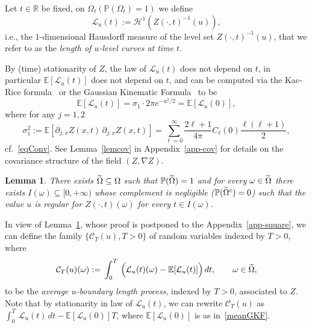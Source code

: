 \documentclass[10pt]{amsart}
\newtheorem{lemm}[theo]{Lemma}\newtheorem{prop}[theo]{Proposition}\newtheorem{coro}[theo]{Corollary}\newtheorem{conj}[theo]{Conjecture}
\theoremstyle{definition}\newtheorem{defi}[theo]{Definition}\newtheorem{rema}[theo]{Remark}\newtheorem{exam}[theo]{Example}\newtheorem{exem}[theo]{Example}\newtheorem{nota}[theo]{Notation}
\newcommand{\clC}{\mathcal{C}}
\newcommand{\clL}{\mathcal{L}}
\newcommand{\clH}{\mathcal{H}}
\newcommand{\bbR}{\mathbb{R}}
\newcommand{\bbP}{\mathbb{P}}
\newcommand{\bbE}{\mathbb{E}}
\let\oldtilde\tilde
\renewcommand*{\tilde}[1]{\mathchoice{\widetilde{#1}}{\widetilde{#1}}{\oldtilde{#1}}{\oldtilde{#1}}}
\begin{document}
Let $t\in \bbR$ be fixed, on $\Omega_t (\bbP(\Omega_t)=1)$ we define
\begin{equation}\label{length}
\clL_u(t) := \clH^1\left(Z(\cdot, t)^{-1}(u)\right),
\end{equation}
i.e., the $1$-dimensional Hausdorff measure of the level set $Z(\cdot, t)^{-1}(u)$, that we refer to as the \emph{length of $u$-level curves at time $t$}.

By (time) stationarity of $Z$, the law of $\clL_u(t)$ does not depend on $t$, in particular $\bbE[\clL_u(t)]$ does not depend on $t$, and can be computed via the Kac-Rice formula~\cite[Theorem~6.8]{AW:09} or the Gaussian Kinematic Formula~\cite[Theorem~13.2.1]{adlertaylor} to be
\begin{equation}\label{meanGKF}
\bbE[\clL_u(t)] = \sigma_1 \cdot 2\pi e^{-u^2/2} = \bbE[\clL_u(0)],
\end{equation}
where for any $j=1,2$
\begin{equation}\label{sigma1}
\sigma _{1}^{2}:=\bbE\left[\partial _{j;x}Z(x,t)\,\partial _{j;x}Z(x,t)\right] =\sum_{\ell =0}^{\infty}\frac{2\ell +1}{4\pi }C_{\ell }(0)\frac{\ell (\ell +1)}{2},
\end{equation}
cf.~\eqref{eqConv}. See Lemma~\ref{lemcov} in Appendix~\ref{app-cov} for details on the covariance structure of the field $(Z, \nabla Z)$.

\begin{lemm}\label{lem_basic}
There exists $\tilde \Omega \subseteq \Omega$ such that $
\bbP(\tilde \Omega)=1$ and for every $\omega\in \tilde \Omega$ there exists $I(\omega)\subseteq [0,+\infty)$ whose complement is negligible ($\bbP(\tilde{\Omega}^c)=0$) such that the value $u$ is regular for $Z(\cdot, t)(\omega)$ for every $t\in I(\omega)$.
\end{lemm}

In view of Lemma~\ref{lem_basic}, whose proof is postponed to the Appendix~\ref{app-square}, we can define the family $\{ \clC_T(u), T>0\}$ of random variables indexed by $T>0$, where
\begin{equation}\label{rap_int}
\clC_{T}(u)(\omega):=\,\int_{0}^{T}\,\Big(\clL_{u}(t)(\omega)-\bbE[
\clL_{u}(t)]\Big)\,dt,\qquad \omega\in \tilde \Omega,
\end{equation}
to be the \emph{average $u$-boundary length process}, indexed by $T>0$, associated to $Z$. Note that by stationarity in law of $\clL_u(t)$, we can rewrite $\clC_{T}(u)$ as $\int_{0}^{T}\,\clL_{u}(t)\,dt -\bbE[
\clL_{u}(0)] T$, where $\bbE[
\clL_{u}(0)]$ is as in~\eqref{meanGKF}.
\end{document}
